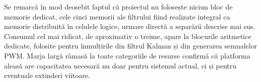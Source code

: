 Se remarcă în mod deosebit faptul că proiectul nu folosește niciun bloc de memorie
dedicat, cele cinci memorii ale filtrului fiind realizate integral ca memorie
distribuită în celulele logice, urmare directă a separării descrise mai sus. Consumul
cel mai ridicat, de aproximativ o treime, apare la blocurile aritmetice dedicate,
folosite pentru înmulțirile din filtrul Kalman și din generarea semnalelor PWM.
Marja largă rămasă la toate categoriile de resurse confirmă că platforma aleasă are
capacitatea necesară nu doar pentru sistemul actual, ci și pentru eventuale extinderi
viitoare.
